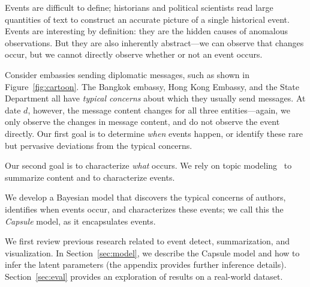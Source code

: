 
Events are difficult to define; historians and political scientists read large quantities of text to construct an accurate picture of a single historical event.  Events are interesting by definition: they are the hidden causes of anomalous observations.  But they are also inherently abstract---we can observe that changes occur, but we cannot directly observe whether or not an event occurs.

Consider embassies sending diplomatic messages, such as shown in Figure~\ref{fig:cartoon}.  The Bangkok embassy, Hong Kong Embassy, and the State Department all have \emph{typical concerns} about which they usually send messages.  At date $d$, however, the message content changes for all three entities---again, we only observe the changes in message content, and do not observe the event directly.  Our first goal is to determine \emph{when} events happen, or identify these rare but pervasive deviations from the typical concerns.

Our second goal is to characterize \emph{what} occurs.  We rely on topic modeling~\cite{Blei:2012} to summarize content and to characterize events.

We develop a Bayesian model that discovers the typical concerns of authors, identifies when events occur, and characterizes these events; we call this the \emph{Capsule} model, as it encapsulates events.


We first review previous research related to event detect, summarization, and visualization.  In Section~\ref{sec:model}, we describe the Capsule model and how to infer the latent parameters (the appendix provides further inference details).  Section~\ref{sec:eval} provides an exploration of results on a real-world dataset.%



